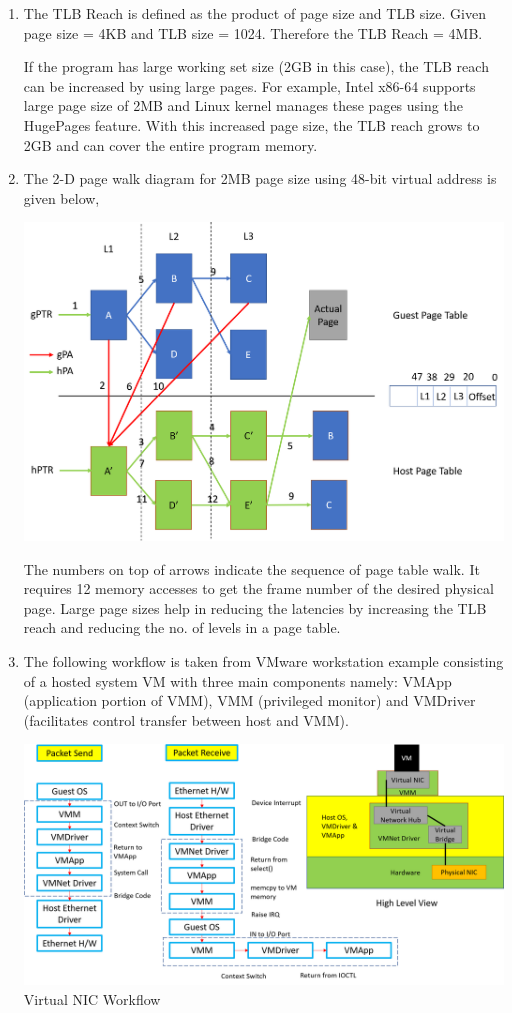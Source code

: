 \documentclass[11pt,a4paper,oneside]{article}
\begin{document}
\begin{enumerate}
		\item The TLB Reach is defined as the product of page size and TLB size. Given page size = 4KB and TLB size = 1024. Therefore the TLB Reach = 4MB.
		
		If the program has large working set size (2GB in this case), the TLB reach can be increased by using large pages. For example, Intel x86-64 supports large page size of 2MB and Linux kernel manages these pages using the HugePages feature. With this increased page size, the TLB reach grows to 2GB and can cover the entire program memory. 
		
		\item The 2-D page walk diagram for 2MB page size using 48-bit virtual address is given below,
		\begin{center}
		   \includegraphics[scale=0.6]{1.png}
		\end{center}
	    The numbers on top of arrows indicate the sequence of page table walk. It requires 12 memory accesses to get the frame number of the desired physical page. Large page sizes help in reducing the latencies by increasing the TLB reach and reducing the no. of levels in a page table.
		
		\item The following workflow is taken from VMware workstation example consisting of a hosted system VM with three main components namely: VMApp (application portion of VMM), VMM (privileged monitor) and VMDriver (facilitates control transfer between host and VMM). 
		
	    \begin{center}
	    	\includegraphics[scale=0.5]{2.png} \\
	    	Virtual NIC Workflow
	    \end{center}
    

\end{enumerate}
\end{document}
